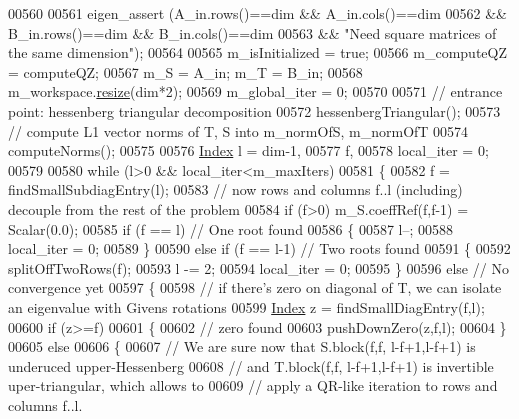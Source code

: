 \begin{DoxyCode}
00560 
00561       eigen\_assert (A\_in.rows()==dim && A\_in.cols()==dim 
00562           && B\_in.rows()==dim && B\_in.cols()==dim 
00563           && \textcolor{stringliteral}{"Need square matrices of the same dimension"});
00564 
00565       m\_isInitialized = \textcolor{keyword}{true};
00566       m\_computeQZ = computeQZ;
00567       m\_S = A\_in; m\_T = B\_in;
00568       m\_workspace.\hyperlink{class_eigen_1_1_plain_object_base_a99d9054ee2d5a40c6e00ded0265e9cea}{resize}(dim*2);
00569       m\_global\_iter = 0;
00570 
00571       \textcolor{comment}{// entrance point: hessenberg triangular decomposition}
00572       hessenbergTriangular();
00573       \textcolor{comment}{// compute L1 vector norms of T, S into m\_normOfS, m\_normOfT}
00574       computeNorms();
00575 
00576       \hyperlink{group___eigenvalues___module_a6201e534e901b5f4e66f72c176b534a3}{Index} l = dim-1, 
00577             f, 
00578             local\_iter = 0;
00579 
00580       \textcolor{keywordflow}{while} (l>0 && local\_iter<m\_maxIters)
00581       \{
00582         f = findSmallSubdiagEntry(l);
00583         \textcolor{comment}{// now rows and columns f..l (including) decouple from the rest of the problem}
00584         \textcolor{keywordflow}{if} (f>0) m\_S.coeffRef(f,f-1) = Scalar(0.0);
00585         \textcolor{keywordflow}{if} (f == l) \textcolor{comment}{// One root found}
00586         \{
00587           l--;
00588           local\_iter = 0;
00589         \}
00590         \textcolor{keywordflow}{else} \textcolor{keywordflow}{if} (f == l-1) \textcolor{comment}{// Two roots found}
00591         \{
00592           splitOffTwoRows(f);
00593           l -= 2;
00594           local\_iter = 0;
00595         \}
00596         \textcolor{keywordflow}{else} \textcolor{comment}{// No convergence yet}
00597         \{
00598           \textcolor{comment}{// if there's zero on diagonal of T, we can isolate an eigenvalue with Givens rotations}
00599           \hyperlink{group___eigenvalues___module_a6201e534e901b5f4e66f72c176b534a3}{Index} z = findSmallDiagEntry(f,l);
00600           \textcolor{keywordflow}{if} (z>=f)
00601           \{
00602             \textcolor{comment}{// zero found}
00603             pushDownZero(z,f,l);
00604           \}
00605           \textcolor{keywordflow}{else}
00606           \{
00607             \textcolor{comment}{// We are sure now that S.block(f,f, l-f+1,l-f+1) is underuced upper-Hessenberg }
00608             \textcolor{comment}{// and T.block(f,f, l-f+1,l-f+1) is invertible uper-triangular, which allows to}
00609             \textcolor{comment}{// apply a QR-like iteration to rows and columns f..l.}

\end{DoxyCode}
